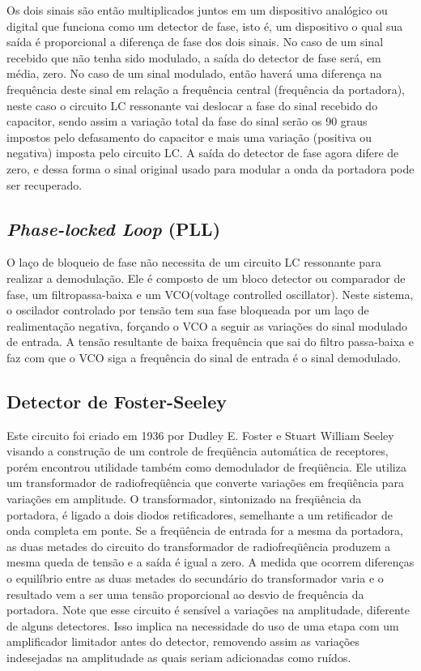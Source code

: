 \documentclass[]{report}
\begin{document}
Os dois sinais são então multiplicados juntos em um dispositivo analógico ou digital que funciona como um detector de fase, isto é, um dispositivo o qual sua saída é proporcional a diferença de fase dos dois sinais.
No caso de um sinal recebido que não tenha sido modulado, a saída do detector de fase será, em média, zero. No caso de um sinal modulado, então haverá uma diferença na frequência deste sinal em relação a frequência central (frequência da portadora), neste caso o circuito LC ressonante vai deslocar a fase do sinal recebido do capacitor, sendo assim a variação total da fase do sinal serão os 90 graus impostos pelo defasamento do capacitor e mais uma variação (positiva ou negativa) imposta pelo circuito LC. A saída do detector de fase agora difere de zero, e dessa forma o sinal original usado para modular a onda da portadora pode ser recuperado.
\subsection{\textit{Phase-locked Loop} (PLL)}
O laço de bloqueio de fase não necessita de um circuito LC ressonante para realizar a demodulação. Ele é composto de um bloco detector ou comparador de fase, um filtropassa-baixa e um VCO(voltage controlled oscillator). Neste sistema, o oscilador controlado por tensão tem sua fase bloqueada por um laço de realimentação negativa, forçando o VCO a seguir as variações do sinal modulado de entrada. A tensão resultante de baixa frequência que sai do filtro passa-baixa e faz com que o VCO siga a frequência do sinal de entrada é o sinal demodulado.
\subsection{Detector de Foster-Seeley}
Este circuito foi criado em 1936 por Dudley E. Foster e Stuart William Seeley visando a construção de um controle de freqüência automática de receptores, porém encontrou utilidade também como demodulador de freqüência. 
Ele utiliza um transformador de radiofreqüência que converte variações em freqüência para variações em amplitude. O transformador, sintonizado na freqüência da portadora, é ligado a dois diodos retificadores, semelhante a um retificador de onda completa em ponte.
Se a freqüência de entrada for a mesma da portadora, as duas metades do circuito do transformador de radiofreqüência produzem a mesma queda de tensão e a saída é igual a zero. A medida que ocorrem diferenças o equilíbrio entre as duas metades do secundário do transformador varia e o resultado vem a ser uma tensão proporcional ao desvio de frequência da portadora.
Note que esse circuito é sensível a variações na amplitudade, diferente de alguns detectores. Isso implica na necessidade do uso de uma etapa com um amplificador limitador antes do detector, removendo assim as variações indesejadas na amplitudade as quais seriam adicionadas como ruídos.
\end{document}
